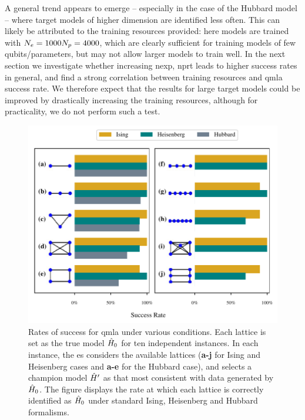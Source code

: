 A general trend appears to emerge -- especially in the case of the Hubbard model --
    where target models of higher dimension are identified less often. 
This can likely be attributed to the training resources provided:
    here models are trained with $N_e=1000 N_p=4000$, 
    which are clearly sufficient for training models of few qubits/parameters, 
    but may not allow larger models to train well.  
In the next section we investigate whether increasing \gls{nexp}, \gls{nprt} leads to higher success rates in general, 
    and find a strong correlation between training resources and \gls{qmla} success rate. 
We therefore expect that the results for large target models could be improved by drastically increasing the training resources, 
    although for practicality, we do not perform such a test.

\par 

\begin{figure}
    \begin{center}
        \includegraphics{theoretical_study/figures/lattice_successes_two_column.pdf}
    \end{center}
    \caption[QMLA success rates for lattices]{
        Rates of success for \gls{qmla} under various conditions. 
        Each lattice is set as the \gls{true model} $\hat{H}_0$ for ten independent instances. 
        In each instance, the \gls{es} considers the available lattices 
            (\textbf{a-j} for Ising and Heisenberg cases and \textbf{a-e} for the Hubbard case), 
            and selects a \gls{champion model} $\hat{H}^{\prime}$ as that most consistent with data generated by $\hat{H}_0$. 
        The figure displays the rate at which each lattice is correctly identified as $\hat{H}_0$
            under standard Ising, Heisenberg and Hubbard formalisms. 
        \figtableref
    }
    \label{fig:lattice_success_rates}
\end{figure}    


